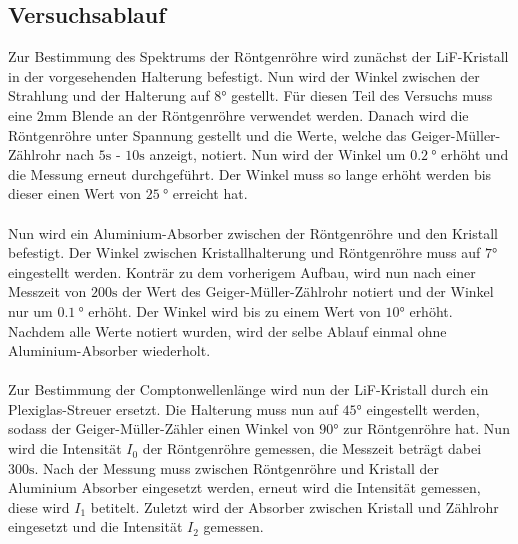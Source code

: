 \subsection{Versuchsablauf}
Zur Bestimmung des Spektrums der Röntgenröhre wird zunächst der LiF-Kristall in der vorgesehenden Halterung befestigt.
Nun wird der Winkel zwischen der Strahlung und der Halterung auf $8 \si{\degree}$ gestellt.
Für diesen Teil des Versuchs muss eine $2 \si{\milli\meter}$ Blende an der Röntgenröhre verwendet werden.
Danach wird die Röntgenröhre unter Spannung gestellt und die Werte, welche das Geiger-Müller-Zählrohr nach $5\si{\second}$ - $10\si{\second}$ anzeigt, notiert.
Nun wird der Winkel um $\SI{0.2}{\degree}$ erhöht und die Messung erneut durchgeführt.
Der Winkel muss so lange erhöht werden bis dieser einen Wert von $\SI{25}{\degree}$ erreicht hat.
\\\\
Nun wird ein Aluminium-Absorber zwischen der Röntgenröhre und den Kristall befestigt.
Der Winkel zwischen Kristallhalterung und Röntgenröhre muss auf $7\si{\degree}$ eingestellt werden.
Konträr zu dem vorherigem Aufbau, wird nun nach einer Messzeit von $200 \si{\second}$ der Wert des Geiger-Müller-Zählrohr notiert und der Winkel nur um $\SI{0.1}{\degree}$ erhöht.
Der Winkel wird bis zu einem Wert von $10\si{\degree}$ erhöht.
Nachdem alle Werte notiert wurden, wird der selbe Ablauf einmal ohne Aluminium-Absorber wiederholt.
\\\\
Zur Bestimmung der Comptonwellenlänge wird nun der LiF-Kristall durch ein Plexiglas-Streuer ersetzt.
Die Halterung muss nun auf $45 \si{\degree}$ eingestellt werden, sodass der Geiger-Müller-Zähler einen Winkel von $90\si{\degree}$ zur Röntgenröhre hat.
Nun wird die Intensität $I_0$ der Röntgenröhre gemessen, die Messzeit beträgt dabei $300\si{\second}$.
Nach der Messung muss zwischen Röntgenröhre und Kristall der Aluminium Absorber eingesetzt werden, erneut wird die Intensität gemessen, diese wird $I_1$ betitelt.
Zuletzt wird der Absorber zwischen Kristall und Zählrohr eingesetzt und die Intensität $I_2$ gemessen.
